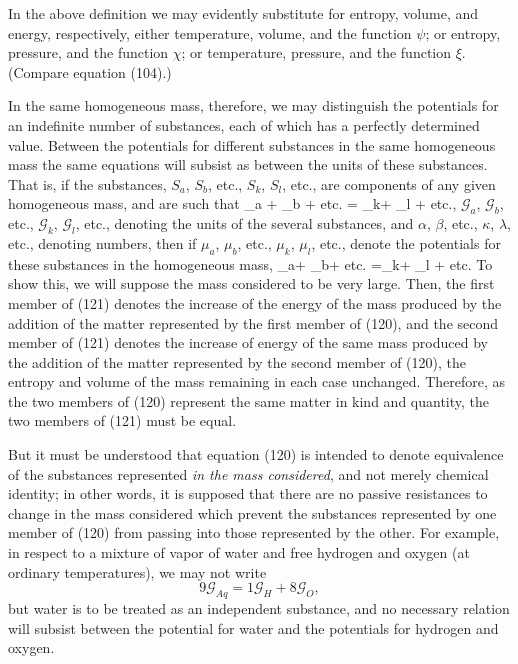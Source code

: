 \documentclass[12pt]{article}
\begin{document}
In the above definition we may evidently substitute for entropy, volume, and energy, respectively, either temperature, volume, and the function $\psi$; or entropy, pressure, and the function $\chi$; or temperature, pressure, and the function $\xi$. (Compare equation (104).)



In the same homogeneous mass, therefore, we may distinguish the potentials for an indefinite number of substances, each of which has a perfectly determined value.
Between the potentials for different substances in the same homogeneous mass the same equations will subsist as between the units of these substances.  That is, if the substances, $S_a$, $S_b$, etc., $S_k$, $S_l$, etc., are components of any given homogeneous mass, and are such that
\eqs \alpha {}_a +  \beta {}_b + etc. = \kappa {}_k+ \lambda {}_l + etc.,  \label{120}\eqe
$\mathcal{G}_a$, $\mathcal{G}_b$, etc., $\mathcal{G}_k$, $\mathcal{G}_l$, etc., denoting the units of the several substances, and $\alpha$, $\beta$, etc., $\kappa$, $\lambda$, etc., denoting numbers, then if $\mu_a$, $\mu_b$, etc., $\mu_k$, $\mu_l$, etc., denote the potentials for these substances in the homogeneous mass,
\eqs \alpha \mu_a+ \beta \mu_b+ etc. =\kappa \mu_k+ \lambda 
\mu_l + etc.    \label{121}\eqe
To show this, we will suppose the mass considered to be very large. Then, the first member of (121) denotes the increase of the energy of the mass produced by the addition of the matter represented by the first member of (120), and the second member of (121) denotes the increase of energy of the same mass produced by the addition of the matter represented by the second member of (120), the entropy and volume of the mass remaining in each case unchanged. Therefore, as the two members of (120) represent the same matter in kind and quantity, the two members of (121) must be equal.


But it must be understood that equation (120) is intended to denote equivalence of the substances represented \textit{in the mass considered}, and not merely chemical identity; in other words, it is supposed that there are no passive resistances to change in the mass considered which prevent the substances represented by one member of (120) from passing into those represented by the other. For example, in respect to a mixture of vapor of water and free hydrogen and oxygen (at ordinary temperatures), we may not write
$$9 \mathcal{G}_{Aq} = 1 \mathcal{G}_H + 8 \mathcal{G}_O,$$
but water is to be treated as an independent substance, and no necessary relation will subsist between the potential for water and the potentials for hydrogen and oxygen.
\end{document}
